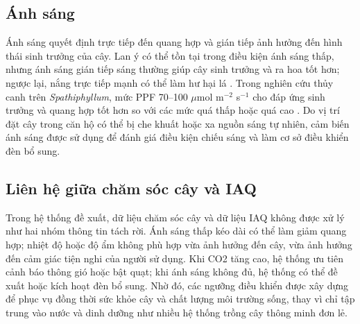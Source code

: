 \subsection{Ánh sáng}
Ánh sáng quyết định trực tiếp đến quang hợp và gián tiếp ảnh hưởng đến hình thái sinh trưởng của cây. Lan ý có thể tồn tại trong điều kiện ánh sáng thấp, nhưng ánh sáng gián tiếp sáng thường giúp cây sinh trưởng và ra hoa tốt hơn; ngược lại, nắng trực tiếp mạnh có thể làm hư hại lá \cite{peace_lily_care_bhg}. Trong nghiên cứu thủy canh trên \textit{Spathiphyllum}, mức PPF 70--100 $\mu$mol m$^{-2}$ s$^{-1}$ cho đáp ứng sinh trưởng và quang hợp tốt hơn so với các mức quá thấp hoặc quá cao \cite{peace_lily_ec_ppf}. Do vị trí đặt cây trong căn hộ có thể bị che khuất hoặc xa nguồn sáng tự nhiên, cảm biến ánh sáng được sử dụng để đánh giá điều kiện chiếu sáng và làm cơ sở điều khiển đèn bổ sung.

\subsection{Liên hệ giữa chăm sóc cây và IAQ}
Trong hệ thống đề xuất, dữ liệu chăm sóc cây và dữ liệu IAQ không được xử lý như hai nhóm thông tin tách rời. Ánh sáng thấp kéo dài có thể làm giảm quang hợp; nhiệt độ hoặc độ ẩm không phù hợp vừa ảnh hưởng đến cây, vừa ảnh hưởng đến cảm giác tiện nghi của người sử dụng. Khi CO2 tăng cao, hệ thống ưu tiên cảnh báo thông gió hoặc bật quạt; khi ánh sáng không đủ, hệ thống có thể đề xuất hoặc kích hoạt đèn bổ sung. Nhờ đó, các ngưỡng điều khiển được xây dựng để phục vụ đồng thời sức khỏe cây và chất lượng môi trường sống, thay vì chỉ tập trung vào nước và dinh dưỡng như nhiều hệ thống trồng cây thông minh đơn lẻ.
